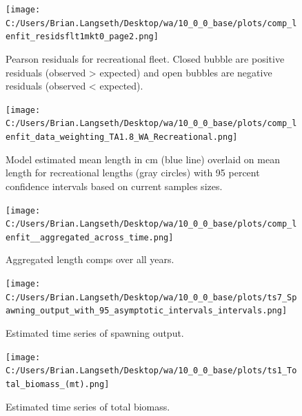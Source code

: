 \documentclass[11pt,
  english,
  letterpaper,
]{article}
\begin{document}
\tagmcend\tagstructend


\begin{figure}
\centering
\texttt{[image: C:/Users/Brian.Langseth/Desktop/wa/10\_0\_0\_base/plots/comp\_lenfit\_residsflt1mkt0\_page2.png]}
\caption{Pearson residuals for recreational fleet. Closed bubble are positive residuals (observed \textgreater{} expected) and open bubbles are negative residuals (observed \textless{} expected).\label{fig:rec-pearson}}
\end{figure}

\tagmcend\tagstructend


\begin{figure}
\centering
\texttt{[image: C:/Users/Brian.Langseth/Desktop/wa/10\_0\_0\_base/plots/comp\_lenfit\_data\_weighting\_TA1.8\_WA\_Recreational.png]}
\caption{Model estimated mean length in cm (blue line) overlaid on mean length for recreational lengths (gray circles) with 95 percent confidence intervals based on current samples sizes.\label{fig:rec-mean-len-fit}}
\end{figure}

\tagmcend\tagstructend


\begin{figure}
\centering
\texttt{[image: C:/Users/Brian.Langseth/Desktop/wa/10\_0\_0\_base/plots/comp\_lenfit\_\_aggregated\_across\_time.png]}
\caption{Aggregated length comps over all years.\label{fig:agg-len-fit}}
\end{figure}

\tagmcend\tagstructend


\begin{figure}
\centering
\texttt{[image: C:/Users/Brian.Langseth/Desktop/wa/10\_0\_0\_base/plots/ts7\_Spawning\_output\_with\_95\_asymptotic\_intervals\_intervals.png]}
\caption{Estimated time series of spawning output.\label{fig:ssb}}
\end{figure}

\tagmcend\tagstructend


\begin{figure}
\centering
\texttt{[image: C:/Users/Brian.Langseth/Desktop/wa/10\_0\_0\_base/plots/ts1\_Total\_biomass\_(mt).png]}
\caption{Estimated time series of total biomass.\label{fig:tot-bio}}
\end{figure}
\end{document}

